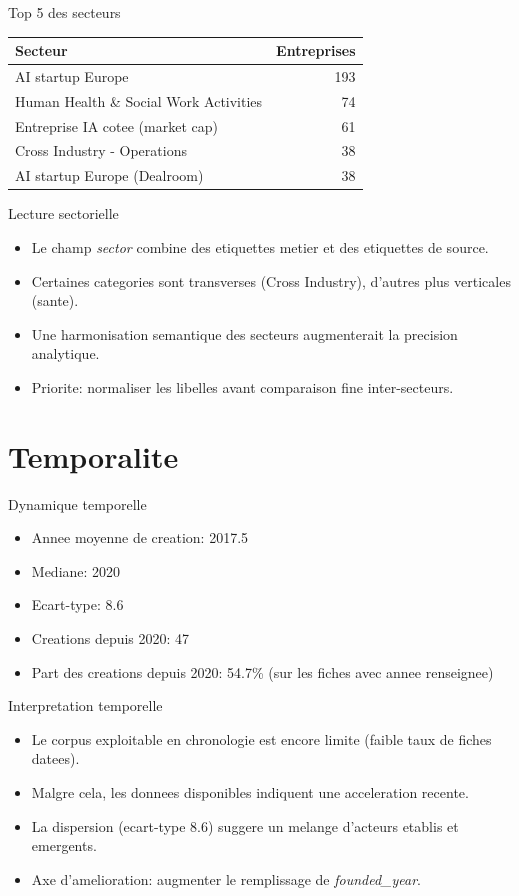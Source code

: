 \documentclass[aspectratio=169]{beamer}
\begin{document}
\begin{frame}{Top 5 des secteurs}
\begin{table}
\centering
\begin{tabular}{lr}
\toprule
Secteur & Entreprises \\
\midrule
AI startup Europe & 193 \\
Human Health \& Social Work Activities & 74 \\
Entreprise IA cotee (market cap) & 61 \\
Cross Industry - Operations & 38 \\
AI startup Europe (Dealroom) & 38 \\
\bottomrule
\end{tabular}
\end{table}
\end{frame}

\begin{frame}{Lecture sectorielle}
\begin{itemize}
  \item Le champ \textit{sector} combine des etiquettes metier et des etiquettes de source.
  \item Certaines categories sont transverses (Cross Industry), d'autres plus verticales (sante).
  \item Une harmonisation semantique des secteurs augmenterait la precision analytique.
  \item Priorite: normaliser les libelles avant comparaison fine inter-secteurs.
\end{itemize}
\end{frame}

\section{Temporalite}

\begin{frame}{Dynamique temporelle}
\begin{itemize}
  \item Annee moyenne de creation: 2017.5
  \item Mediane: 2020
  \item Ecart-type: 8.6
  \item Creations depuis 2020: 47
  \item Part des creations depuis 2020: 54.7\% (sur les fiches avec annee renseignee)
\end{itemize}
\end{frame}

\begin{frame}{Interpretation temporelle}
\begin{itemize}
  \item Le corpus exploitable en chronologie est encore limite (faible taux de fiches datees).
  \item Malgre cela, les donnees disponibles indiquent une acceleration recente.
  \item La dispersion (ecart-type 8.6) suggere un melange d'acteurs etablis et emergents.
  \item Axe d'amelioration: augmenter le remplissage de \textit{founded\_year}.
\end{itemize}
\end{frame}
\end{document}
